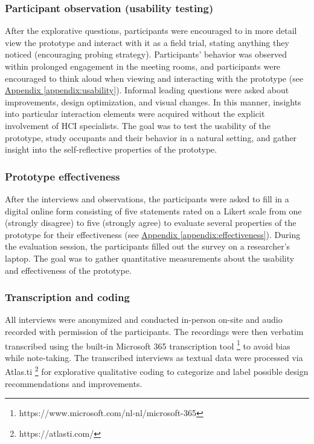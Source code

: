 \subsubsection{Participant observation (usability testing)}

After the explorative questions, participants were encouraged to in more detail view the prototype and interact with it as a field trial, stating anything they noticed (encouraging probing strategy). Participants' behavior was observed within prolonged engagement in the meeting rooms, and participants were encouraged to think aloud when viewing and interacting with the prototype (see \hyperref[appendix:usability]{Appendix \ref*{appendix:usability}}). Informal leading questions were asked about improvements, design optimization, and visual changes. In this manner, insights into particular interaction elements were acquired without the explicit involvement of HCI specialists. The goal was to test the usability of the prototype, study occupants and their behavior in a natural setting, and gather insight into the self-reflective properties of the prototype. 

\subsubsection{Prototype effectiveness}

After the interviews and observations, the participants were asked to fill in a digital online form consisting of five statements rated on a Likert scale from one (strongly disagree) to five (strongly agree) to evaluate several properties of the prototype for their effectiveness (see \hyperref[appendix:effectiveness]{Appendix \ref*{appendix:effectiveness}}). During the evaluation session, the participants filled out the survey on a researcher's laptop. The goal was to gather quantitative measurements about the usability and effectiveness of the prototype.

\subsubsection{Transcription and coding}
All interviews were anonymized and conducted in-person on-site and audio recorded with permission of the participants. The recordings were then verbatim transcribed using the built-in Microsoft 365 transcription tool \footnote{https://www.microsoft.com/nl-nl/microsoft-365} to avoid bias while note-taking. The transcribed interviews as textual data were processed via Atlas.ti \footnote{https://atlasti.com/} for explorative qualitative coding to categorize and label possible design recommendations and improvements.